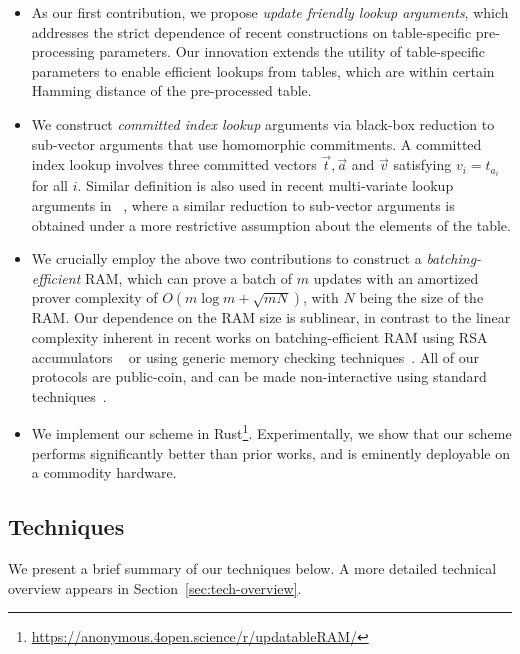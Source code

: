 \begin{itemize}[leftmargin=2em]
	\item As our first contribution, we propose {\em update friendly lookup arguments}, which addresses
	the strict dependence of recent constructions on table-specific pre-processing parameters. Our
	innovation extends the utility of table-specific parameters to enable efficient lookups from tables,
	which are within certain Hamming distance of the pre-processed table.
	\item We construct {\em committed index lookup} arguments via black-box reduction to
	sub-vector arguments that use homomorphic commitments. A committed index lookup involves
	three committed vectors $\vec{t},\vec{a}$ and $\vec{v}$ satisfying $v_i=t_{a_i}$ for all $i$. Similar
	definition is also used in recent multi-variate lookup arguments in ~\cite{lasso}, where a similar reduction
	to sub-vector arguments is obtained under a more restrictive assumption about the elements of the table.
	\item We crucially employ the above two contributions to construct a {\em batching-efficient} RAM, which
	can prove a batch of $m$ updates with an amortized prover complexity of $O(m\log m + \sqrt{mN})$,
	with $N$ being the size of the RAM. Our dependence on the RAM size is sublinear, in contrast to the linear complexity
	inherent in recent works on batching-efficient RAM using RSA accumulators ~\cite{USENIX:OWWB20,CCS:CFHKKO22} or using generic memory checking techniques~\cite{NDSS:WSRBW15,USENIX:BCTV14,C:BCGTV13,SP:ZGKPP18}. All of our protocols are public-coin, and can be made non-interactive using standard techniques~\cite{C:FiaSha86}. 
	
	\item We implement our scheme in Rust\footnote{\url{https://anonymous.4open.science/r/updatableRAM/}}.
	Experimentally, we show that our scheme performs significantly better than prior works,
	and is eminently deployable on a commodity hardware.
\end{itemize}


\subsection{Techniques}\label{subsec:techniques}

We present a brief summary of our techniques below. A more detailed technical overview appears in Section~\ref{sec:tech-overview}.

\medskip

